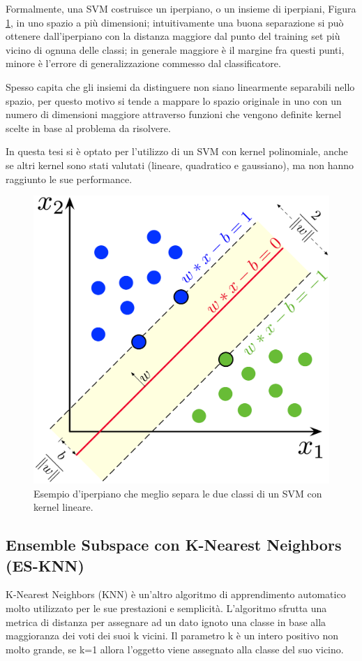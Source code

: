Formalmente, una SVM costruisce un iperpiano, o un insieme di iperpiani, Figura \ref{fig:svm}, in uno spazio a più dimensioni; intuitivamente una buona separazione si può ottenere dall'iperpiano con la distanza maggiore dal punto del training set più vicino di ognuna delle classi; in generale maggiore è il margine fra questi punti, minore è l'errore di generalizzazione commesso dal classificatore. 

Spesso capita che gli insiemi da distinguere non siano linearmente separabili nello spazio, per questo motivo si tende a mappare lo spazio originale in uno con un numero di dimensioni maggiore attraverso funzioni che vengono definite kernel scelte in base al problema da risolvere.

In questa tesi si è optato per l'utilizzo di un SVM con kernel polinomiale, anche se altri kernel sono stati valutati (lineare, quadratico e gaussiano), ma non hanno raggiunto le sue performance.

\begin{figure}[!htb]
    \centering
    \includegraphics[width=.4\textwidth]{figure/svm.png}
    \caption{Esempio d'iperpiano che meglio separa le due classi di un SVM con kernel lineare.}
    \label{fig:svm}
\end{figure}

\subsection{Ensemble Subspace con K-Nearest Neighbors (ES-KNN)}
\label{ssec:ensemble-subspace-con-knn}

K-Nearest Neighbors (KNN) è un'altro algoritmo di apprendimento automatico molto utilizzato per le sue prestazioni e semplicità. L'algoritmo sfrutta una metrica di distanza per assegnare ad un dato ignoto una classe in base alla maggioranza dei voti dei suoi k vicini. Il parametro k è un intero positivo non molto grande, se k=1 allora l'oggetto viene assegnato alla classe del suo vicino. 

